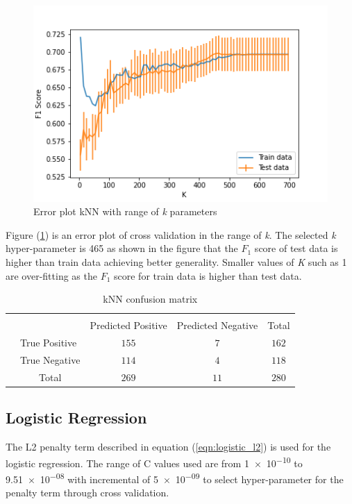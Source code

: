 \documentclass[transmag]{IEEEtran}
\begin{document}
\begin{figure}[h]
	\includegraphics[width=\columnwidth]{knn_cv_k.png} 
    \caption{Error plot kNN with range of \emph{k} parameters}%
    \label{fig:knn_k}%
\end{figure}
\noindent Figure (\ref{fig:knn_k}) is an error plot of cross validation in the range of \emph{k}. The selected \emph{k} hyper-parameter is 465 as shown in the figure that the $F_1$ score of test data is higher than train data achieving better generality. Smaller values of \emph{K} such as 1 are over-fitting as the $F_1$ score  for train data is higher than test data.

\begin{table}[h]
\begin{center}
\begin{tabular}{l|l|c|c|c}
\multicolumn{2}{c}{}&\multicolumn{2}{c}{}&\\
\cline{3-4}
\multicolumn{2}{c|}{}& Predicted Positive & Predicted Negative &\multicolumn{1}{c}{Total}\\
\cline{2-4}
\multirow{2}{*}{}& True Positive & $155$ & $7$ & $162$\\
\cline{2-4}
& True Negative & $114$ & $4$ & $118$\\
\cline{2-4}
\multicolumn{1}{c}{} & \multicolumn{1}{c}{Total} & \multicolumn{1}{c}{$269$} & \multicolumn{    1}{c}{$11$} & \multicolumn{1}{c}{$280$}\\
\end{tabular}
\end{center}
\caption{kNN confusion matrix} 
\label{table:confusion_knn}
\end{table}

\subsection{Logistic Regression}
\noindent The L2 penalty term described in equation (\ref{eqn:logistic_l2}) is used for the logistic regression. The range of C values used are from \num{1e-10} to \num{9.51e-08} with incremental of \num{5e-09} to select hyper-parameter for the penalty term through cross validation.
\end{document}
